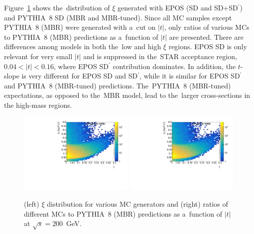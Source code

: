 Figure~\ref{fig:STARtrueMC} shows the~distribution of $\xi$ generated with  EPOS (SD and SD+SD$^\prime$) and PYTHIA~8 SD (MBR and MBR-tuned). Since all MC samples except PYTHIA~8 (MBR) were generated with a~cut on $|t|$,
only ratios of various MCs to PYTHIA~8 (MBR) predictions as a~function of $|t|$ are presented.
There are differences among models in both the~low and high $\xi$ regions. %
EPOS SD is only relevant for very small $|t|$ and is suppressed in the~STAR acceptance region, $0.04<|t|<0.16$, where EPOS SD$^\prime$ contribution dominates. In addition, the $t$-slope is  very different for EPOS SD and SD$^\prime$, while it is similar for EPOS SD$^\prime$ and PYTHIA~8 (MBR-tuned) predictions. The~PYTHIA~8 (MBR-tuned) expectations, as opposed to the~MBR model,  lead
to the~larger cross-sections in the high-mass regions.
\begin{figure}[h!]
	\centering
	\includegraphics[width=0.49\textwidth, page=14]{chapters/dataSampleSTAR/img/true.pdf}
	\includegraphics[width=0.49\textwidth, page=13]{chapters/dataSampleSTAR/img/true.pdf}
	\caption{(left) $\xi$ distribution for various MC generators and  (right)  ratios of different MCs to PYTHIA~8 (MBR) predictions as a~function of $|t|$   at $\sqrt{s} = 200$~GeV.}
	\label{fig:STARtrueMC}
\end{figure}